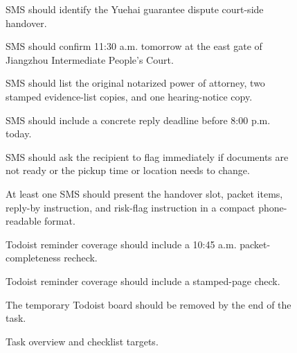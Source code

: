 \begin{figure}[h]
{    \vspace{2pt}
    \par
     SMS should identify the Yuehai guarantee dispute court-side handover.
    \par
     SMS should confirm 11:30 a.m. tomorrow at the east gate of Jiangzhou Intermediate People's Court.
    \par
     SMS should list the original notarized power of attorney, two stamped evidence-list copies, and one hearing-notice copy.
    \par
     SMS should include a concrete reply deadline before 8:00 p.m. today.
    \par
     SMS should ask the recipient to flag immediately if documents are not ready or the pickup time or location needs to change.
    \par
     At least one SMS should present the handover slot, packet items, reply-by instruction, and risk-flag instruction in a compact phone-readable format.
    \par
     Todoist reminder coverage should include a 10:45 a.m. packet-completeness recheck.
    \par
     Todoist reminder coverage should include a stamped-page check.
    \par
     The temporary Todoist board should be removed by the end of the task.
    \par
    }
    \caption{Task overview and checklist targets.}
    \label{fig:case_leihaodi_1_checklist_task}
\end{figure}

